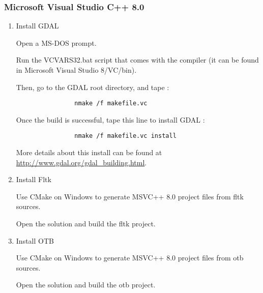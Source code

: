 \subsubsection{Microsoft Visual Studio C++ 8.0}
\begin{enumerate}
\item Install GDAL

        Open a MS-DOS prompt.
        
        Run the VCVARS32.bat script that comes with the compiler (it can be found in 
        Microsoft Visual Studio 8/VC/bin).
        
        Then, go to the GDAL root directory, and tape : 
        \begin{verbatim}
                nmake /f makefile.vc
        \end{verbatim}
        
        Once the build is successful, tape this line to install GDAL :
        \begin{verbatim}
                nmake /f makefile.vc install
        \end{verbatim}
	
        More details about this install can be found at \url{http://www.gdal.org/gdal_building.html}.
                
        
\item Install Fltk

	Use CMake on Windows to generate MSVC++ 8.0 project files from fltk sources.
	
	Open the solution and build the fltk project.

\item Install OTB

	Use CMake on Windows to generate MSVC++ 8.0 project files from otb sources.
	
	Open the solution and build the otb project.

\end{enumerate}


